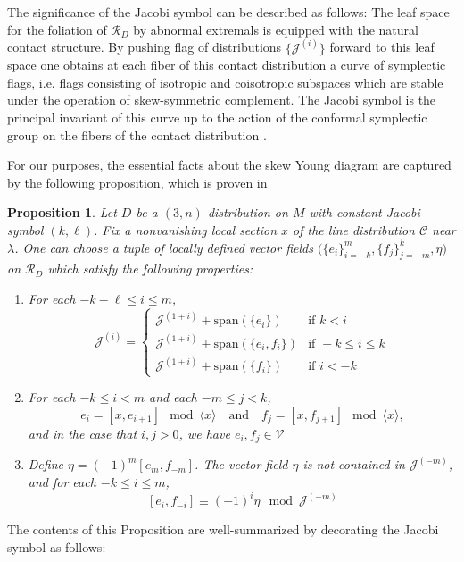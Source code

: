 \documentclass[11pt,letterpaper]{amsart}
\newtheorem{prop}[theorem]{Proposition}
\numberwithin{equation}{section}
\begin{document}
The significance of the Jacobi symbol can be described as follows: The leaf space for the foliation of $\mathcal{R}_D$ by abnormal extremals is equipped with the natural contact structure. By pushing flag of distributions $\{\mathcal{J}^{(i)}\}$ forward to this leaf space one obtains at each fiber of this contact distribution a curve of symplectic flags, i.e. flags consisting of isotropic and coisotropic subspaces which are stable under the operation of skew-symmetric complement. The Jacobi symbol is the principal invariant of this curve up to the action of the conformal symplectic group on the fibers of the contact distribution \cite{Doubrov2012curves} \cite{doubrov2016JacobiCurves}. 

For our purposes, the essential facts about the skew Young diagram are captured by the following proposition, which is proven in \cite{doubrov2016JacobiCurves}

\begin{prop}
\label{Prop: JacobiFrame}
    Let $D$ be a $(3,n)$ distribution on $M$ with constant Jacobi symbol $(k,\ell)$. Fix a nonvanishing local section $x$ of the line distribution $\mathcal{C}$ near $\lambda$. One can choose a tuple of locally defined vector fields $\big(\{e_i\}_{i=-k}^{m},\{f_j\}_{j=-m}^k,\eta\big)$ on $\mathcal{R}_D$ which satisfy the following properties:
    \begin{enumerate}
        \item For each $-k-\ell\leq i \leq m$, 
        \[
            \mathcal J^{(i)} = \begin{cases}
                \mathcal J^{(1+i)}+\mathrm{span}(\{e_i\})& \text{if } k < i
                \\
                \mathcal J^{(1+i)}+\mathrm{span}(\{e_i,f_i\}) & \text{if }-k\leq i \leq k
                \\
                \mathcal J^{(1+i)}+\mathrm{span}(\{f_i\})& \text{if } i < -k
            \end{cases}
        \]
        \item For each $-k\leq i<m$ and each $-m\leq j<k$,
        \[
            e_i = [x,e_{i+1}] \mod \langle x\rangle \quad \text{and}\quad f_j = [x,f_{j+1}] \mod \langle x\rangle,
        \]
        and in the case that $i,j>0$, we have $e_i,f_j\in \mathcal{V}$
        \item Define $\eta = (-1)^{m}[e_{m},f_{-m}]$. The vector field $\eta$ is not contained in $\mathcal J^{(-m)}$, and for each $-k \leq i\leq m$,
        \[
            [e_i,f_{-i}] \equiv (-1)^i\eta \mod \mathcal{J}^{(-m)}
        \]
        
    \end{enumerate}
\end{prop}
The contents of this Proposition are well-summarized by decorating the Jacobi symbol as follows:
\end{document}
